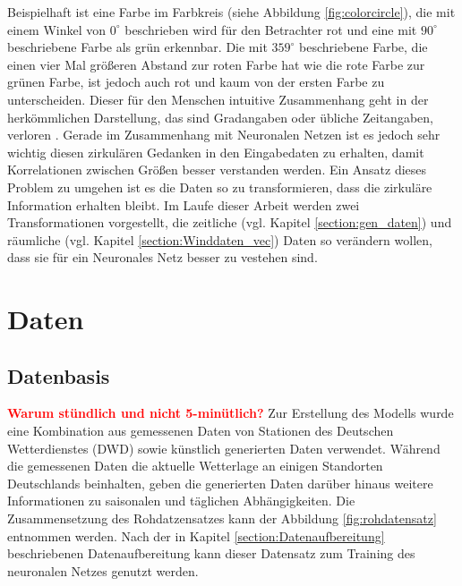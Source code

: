 \documentclass[
12pt, %
toc=listofnumbered, %
toc=chapterentrydotfill, %
numbers=noenddot, %
captions=tableheading, %
bibliography=numbered
]{scrreprt}
\let\Oldsection\section
\renewcommand{\section}{\FloatBarrier\Oldsection}
\newcommand{\highlight}[1]{\textbf{\textcolor{red}{#1}}}
\begin{document}
Beispielhaft ist eine Farbe im Farbkreis (siehe Abbildung \ref{fig:colorcircle}), die mit einem Winkel von $0^\circ$ beschrieben wird für den Betrachter rot und eine mit $90^\circ$ beschriebene Farbe als grün erkennbar. Die mit $359^\circ$ beschriebene Farbe, die einen 
vier Mal größeren Abstand zur roten Farbe hat wie die rote Farbe zur grünen Farbe, ist jedoch auch rot und kaum von der ersten Farbe zu unterscheiden. 
Dieser für den Menschen intuitive Zusammenhang geht in der herkömmlichen Darstellung, das sind Gradangaben oder übliche Zeitangaben, verloren \cite{2016_London_EncodingCyclicalContinuous}. 
Gerade im Zusammenhang mit Neuronalen Netzen ist es jedoch sehr wichtig diesen zirkulären Gedanken in den Eingabedaten zu erhalten, damit Korrelationen zwischen Größen besser verstanden werden. 
Ein Ansatz dieses Problem zu umgehen ist es die Daten so zu transformieren, dass die zirkuläre Information erhalten bleibt. Im Laufe dieser Arbeit werden zwei Transformationen vorgestellt, die zeitliche (vgl. Kapitel \ref{section:gen_daten}) und räumliche (vgl. Kapitel \ref{section:Winddaten_vec}) Daten so verändern wollen, dass sie für ein Neuronales Netz besser zu vestehen sind.


\chapter{Daten}

\section{Datenbasis}\label{section:datenbasis}
\highlight{Warum stündlich und nicht 5-minütlich?}
Zur Erstellung des Modells wurde eine Kombination aus gemessenen Daten von Stationen des Deutschen Wetterdienstes (DWD) sowie künstlich generierten Daten verwendet.
Während die gemessenen Daten die aktuelle Wetterlage an einigen Standorten Deutschlands beinhalten, geben die generierten Daten darüber hinaus weitere Informationen zu saisonalen und täglichen Abhängigkeiten. Die Zusammensetzung des Rohdatzensatzes kann der Abbildung \ref{fig:rohdatensatz} entnommen werden. Nach der in Kapitel \ref{section:Datenaufbereitung} beschriebenen Datenaufbereitung kann dieser Datensatz zum Training des neuronalen Netzes genutzt werden.
\end{document}
